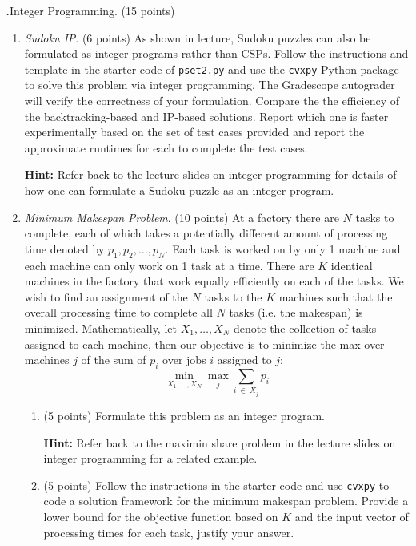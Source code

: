 \documentclass[12pt]{amsart}
\newenvironment{statement}[1]{\smallskip\noindent\color[rgb]{0.0,0.0,0.0} {\bf #1.}}{}
\theoremstyle{definition}
\theoremstyle{remark}
\newcommand{\1}{\mathds{1}}
\begin{document}
\newpage

\begin{statement}{5}
\emph{Integer Programming}. (15 points)
\begin{enumerate}
    \item \emph{Sudoku IP}. (6 points) As shown in lecture, Sudoku puzzles can also be formulated as integer programs rather than CSPs. Follow the instructions and template in the starter code of \texttt{pset2.py} and use the \texttt{cvxpy} Python package to solve this problem via integer programming. The Gradescope autograder will verify the correctness of your formulation. Compare the the efficiency of the backtracking-based and IP-based solutions. Report which one is faster experimentally based on the set of test cases provided and report the approximate runtimes for each to complete the test cases.
    
    \noindent\textbf{Hint:} Refer back to the lecture slides on integer programming for details of how one can formulate a Sudoku puzzle as an integer program. 
    
    \item \emph{Minimum Makespan Problem}. (10 points) At a factory there are $N$ tasks to complete, each of which takes a potentially different amount of processing time denoted by $p_1, p_2, \ldots, p_N$. Each task is worked on by only 1 machine and each machine can only work on 1 task at a time. There are $K$ identical machines in the factory that work equally efficiently on each of the tasks. We wish to find an assignment of the $N$ tasks to the $K$ machines such that the overall processing time to complete all $N$ tasks (i.e. the makespan) is minimized. Mathematically, let $X_1, \ldots, X_N$ denote the collection of tasks assigned to each machine, then our objective is to minimize the max over machines $j$ of the sum of $p_i$ over jobs $i$ assigned to $j$:
    $$
    \underset{X_1, \ldots, X_N}{\min} \underset{j}{\max} \sum_{i \: \in \: X_j} p_i 
    $$
    
    \begin{enumerate}
        \item (5 points) Formulate this problem as an integer program.
        
        \noindent\textbf{Hint:} Refer back to the maximin share problem in the lecture slides on integer programming for a related example. 
        \item (5 points) Follow the instructions in the starter code and use \texttt{cvxpy} to code a solution framework for the minimum makespan problem. Provide a lower bound for the objective function based on $K$ and the input vector of processing times for each task, justify your answer.
    \end{enumerate}
\end{enumerate}

\end{statement}
\end{document}
